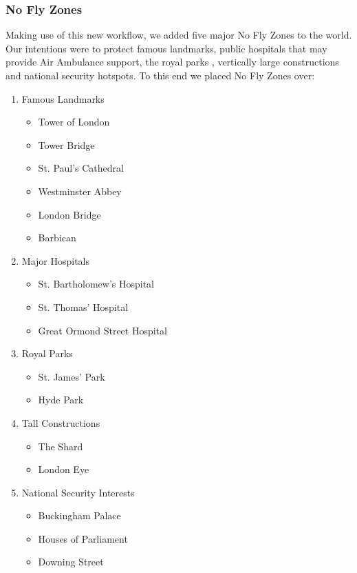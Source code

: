 \documentclass[a4paper,12pt,titlepage]{article}
\begin{document}
\subsubsection{No Fly Zones}
Making use of this new workflow, we added five major No Fly Zones to the world. Our intentions were to protect famous landmarks, public hospitals that may provide Air Ambulance support, the royal parks \cite{Blunden2016}, vertically large constructions and national security hotspots. To this end we placed No Fly Zones over:
\begin{enumerate}
   \item Famous Landmarks
   \begin{multicols}{2}
     \begin{itemize}
       \item Tower of London
       \item Tower Bridge
       \item St. Paul's Cathedral
       \item Westminster Abbey
       \item London Bridge
       \item Barbican
     \end{itemize}
   \end{multicols}
   \item Major Hospitals
   \begin{multicols}{2}
     \begin{itemize}
       \item St. Bartholomew's Hospital
       \item St. Thomas' Hospital
       \item Great Ormond Street Hospital
     \end{itemize}
   \end{multicols}
   \item Royal Parks
   \begin{multicols}{2}
     \begin{itemize}
       \item St. James' Park
       \item Hyde Park
     \end{itemize}
   \end{multicols}
   \item Tall Constructions
   \begin{multicols}{2}
     \begin{itemize}
       \item The Shard
       \item London Eye
     \end{itemize}
   \end{multicols}
   \item National Security Interests
   \begin{multicols}{2}
     \begin{itemize}
       \item Buckingham Palace
       \item Houses of Parliament
       \item Downing Street
     \end{itemize}
   \end{multicols}
\end{enumerate}
\end{document}
